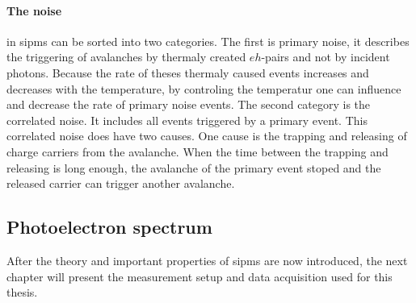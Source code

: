 \paragraph{The noise} in \acp{sipm} can be sorted into two categories.
The first is primary noise, it describes the triggering of avalanches by thermaly created $eh$-pairs and not by incident photons.
Because the rate of theses thermaly caused events increases and decreases with the temperature, by controling the temperatur one can influence and decrease the rate of primary noise events.
The second category is the correlated noise.
It includes all events triggered by a primary event.
This correlated noise does have two causes.
One cause is the trapping and releasing of charge carriers from the avalanche. 
When the time between the trapping and releasing is long enough, the avalanche of the primary event stoped and the released carrier can trigger another avalanche.



\subsection{Photoelectron spectrum}


After the theory and important properties of \acp{sipm} are now introduced, the next chapter will present the measurement setup and data acquisition used for this thesis.
